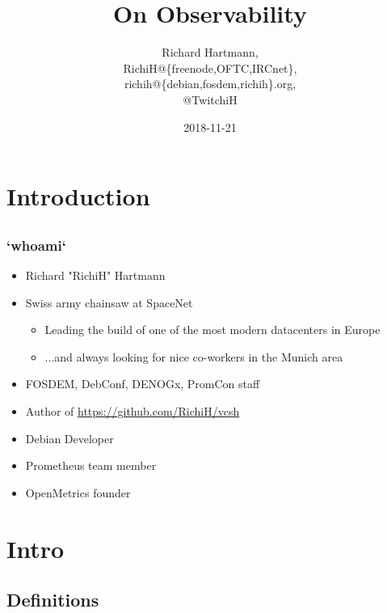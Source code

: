\documentclass[aspectratio=169]{beamer}
\title{On Observability}
\subtitle{}
\author{Richard Hartmann,\\
RichiH@\{freenode,OFTC,IRCnet\},\\
richih@\{debian,fosdem,richih\}.org,\\
@TwitchiH}
\date{2018-11-21}
\begin{document}
\setcounter{tocdepth}{1}

\section{Introduction}

\subsection{}

\begin{frame}
	\titlepage
\end{frame}


\subsection{}

\begin{frame}
	\frametitle{`whoami`}
	\begin{itemize}
		\item Richard "RichiH" Hartmann
		\item Swiss army chainsaw at SpaceNet
		\begin{itemize}
			\item Leading the build of one of the most modern datacenters in Europe
			\item ...and always looking for nice co-workers in the Munich area
		\end{itemize}
		\item FOSDEM, DebConf, DENOGx, PromCon staff
		\item Author of \url{https://github.com/RichiH/vcsh}
		\item Debian Developer
		\item Prometheus team member
		\item OpenMetrics founder
	\end{itemize}
\end{frame}


\section{Intro}

\subsection{Definitions}
\end{document}
